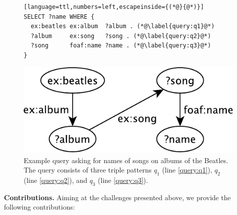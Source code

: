 \begin{figure}[ht]
  \centering
  \begin{minipage}{0.75\linewidth}
\begin{lstlisting}[language=ttl,numbers=left,escapeinside={(*@}{@*)}]
SELECT ?name WHERE {
  ex:beatles ex:album  ?album . (*@\label{query:q1}@*)
  ?album     ex:song   ?song . (*@\label{query:q2}@*)
  ?song      foaf:name ?name . (*@\label{query:q3}@*)
}
\end{lstlisting}
  \end{minipage}
  \includegraphics[width=0.7\linewidth]{figs/query-crop.pdf}
  \caption{Example query asking for names of songs on albums of the
    Beatles. The query consists of three triple patterns $q_1$ (line
    \ref{query:q1}), $q_2$ (line \ref{query:q2}), and $q_3$ (line
    \ref{query:q3}).}
  \label{fig:query}
\end{figure}

\textbf{Contributions.} Aiming at the challenges presented above, we
provide the following contributions:


